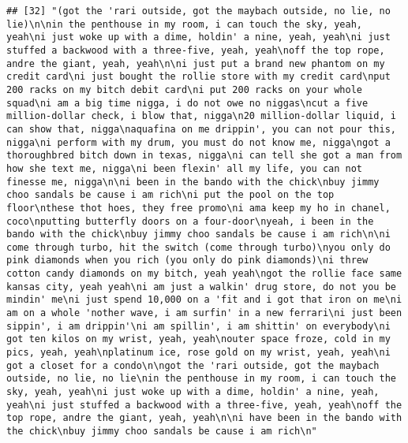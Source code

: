 \documentclass[]{article}
\begin{document}
\begin{verbatim}
## [32] "(got the 'rari outside, got the maybach outside, no lie, no lie)\n\nin the penthouse in my room, i can touch the sky, yeah, yeah\ni just woke up with a dime, holdin' a nine, yeah, yeah\ni just stuffed a backwood with a three-five, yeah, yeah\noff the top rope, andre the giant, yeah, yeah\n\ni just put a brand new phantom on my credit card\ni just bought the rollie store with my credit card\nput 200 racks on my bitch debit card\ni put 200 racks on your whole squad\ni am a big time nigga, i do not owe no niggas\ncut a five million-dollar check, i blow that, nigga\n20 million-dollar liquid, i can show that, nigga\naquafina on me drippin', you can not pour this, nigga\ni perform with my drum, you must do not know me, nigga\ngot a thoroughbred bitch down in texas, nigga\ni can tell she got a man from how she text me, nigga\ni been flexin' all my life, you can not finesse me, nigga\n\ni been in the bando with the chick\nbuy jimmy choo sandals be cause i am rich\ni put the pool on the top floor\nthese thot hoes, they free promo\ni ama keep my ho in chanel, coco\nputting butterfly doors on a four-door\nyeah, i been in the bando with the chick\nbuy jimmy choo sandals be cause i am rich\n\ni come through turbo, hit the switch (come through turbo)\nyou only do pink diamonds when you rich (you only do pink diamonds)\ni threw cotton candy diamonds on my bitch, yeah yeah\ngot the rollie face same kansas city, yeah yeah\ni am just a walkin' drug store, do not you be mindin' me\ni just spend 10,000 on a 'fit and i got that iron on me\ni am on a whole 'nother wave, i am surfin' in a new ferrari\ni just been sippin', i am drippin'\ni am spillin', i am shittin' on everybody\ni got ten kilos on my wrist, yeah, yeah\nouter space froze, cold in my pics, yeah, yeah\nplatinum ice, rose gold on my wrist, yeah, yeah\ni got a closet for a condo\n\ngot the 'rari outside, got the maybach outside, no lie, no lie\nin the penthouse in my room, i can touch the sky, yeah, yeah\ni just woke up with a dime, holdin' a nine, yeah, yeah\ni just stuffed a backwood with a three-five, yeah, yeah\noff the top rope, andre the giant, yeah, yeah\n\ni have been in the bando with the chick\nbuy jimmy choo sandals be cause i am rich\n"                                                                                                                                                                                                                                                                                                                                                                                                                                                                                                                                                                                                                                                                                                                                                                                                                                                                                                                                                                                                                                                                                                                            
\end{verbatim}
\end{document}

